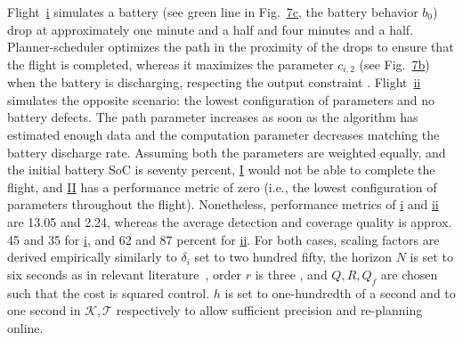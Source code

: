 \documentclass[letterpaper,10pt,journal,twoside]{IEEEtran}
\theoremstyle{definition}
\begin{document}
Flight~\hyperref[fig:ener-dyn-i]{i} simulates a battery ({\color{blue}see} green line {\color{blue}in Fig.~\hyperref[fig:dyn]{7c}}, the battery behavior $b_0$) drop at approximately one minute and a half and four minutes and a half. Planner-scheduler optimizes the path in the proximity of the drops to ensure that the flight is completed, whereas it maximizes the parameter $c_{i,2}$ {\color{blue}(see Fig.~\hyperref[fig:dyn]{7b})} when the battery is discharging, respecting the output constraint%
. Flight~\hyperref[fig:ener-dyn-ii]{ii} simulates the opposite scenario: the lowest configuration of parameters and no battery defects. The path parameter increases as soon as the algorithm has estimated enough data %
and the computation parameter decreases matching the battery discharge rate. 
{\color{blue}
Assuming both the parameters are weighted equally, and the initial battery SoC is seventy percent, \hyperref[fig:trajs-I-static]{I} would not be able to complete the flight, and \hyperref[fig:trajs-II-static]{II} has a performance metric of zero (i.e., the lowest configuration of parameters throughout the flight).
Nonetheless, performance metrics of \hyperref[fig:trajs-dyn-i]{i} and \hyperref[fig:trajs-dyn-ii]{ii} are 13.05 and 2.24, whereas the average detection and coverage quality is approx. 45 and 35 for \hyperref[fig:trajs-dyn-i]{i}, and 62 and 87 percent for \hyperref[fig:trajs-dyn-ii]{ii}.}
For both cases, scaling factors are derived empirically %
{\color{blue}similarly to $\delta_i$ set to two hundred fifty}, 
the horizon $N$ is set to six seconds {\color{blue} as in} relevant literature~\cite{gavilan2015iterative,%
stastny2018nonlinear%
}, order $r$ is three%
, and %
$Q,R,Q_f$ are chosen such that the cost is %
squared control. {\color{blue} $h$ is set to one-hundredth of a second and to one second in $\mathcal{K}, \mathcal{T}$ respectively to allow sufficient precision and re-planning online.}
\end{document}
